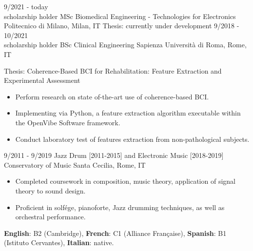 \documentclass[9pt]{developercv} %
\begin{document}
\vspace{-15 pt}
\begin{entrylist}
    \entry
		{9/2021 - today \\\footnotesize{scholarship holder}}
		{MSc Biomedical Engineering - Technologies for Electronics }
		{Politecnico di Milano, Milan, IT}
		{Thesis: currently under development}
    \entry
		{9/2018 - 10/2021 \\\footnotesize{scholarship holder}}
		{BSc Clinical Engineering}
		{Sapienza Università di Roma, Rome, IT}
		{Thesis: Coherence-Based BCI for Rehabilitation: Feature Extraction and Experimental Assessment
   \begin{itemize}[noitemsep,topsep=0pt,parsep=0pt,partopsep=0pt, leftmargin= 10pt]
            \item Perform research on state of-the-art use of coherence-based BCI. 
            \item Implementing via Python, a feature extraction algorithm executable within the OpenVibe Software framework.
            \item Conduct laboratory test of features extraction from non-pathological subjects.

        \end{itemize} 
             }
	\entry
		{9/2011 - 9/2019}
		{Jazz Drum [2011-2015] and Electronic Music [2018-2019]}
		{Conservatory of Music Santa Cecilia, Rome, IT}
		{ \begin{itemize}[noitemsep,topsep=0pt,parsep=0pt,partopsep=0pt, leftmargin= 10pt]
            \item Completed coursework in composition, music theory, application of signal theory to sound design. 
            \item Proficient in solfége, pianoforte, Jazz drumming techniques, as well as orchestral performance.
            \end{itemize}
        }
\end{entrylist}

\vspace{-15 pt}
    \vspace{-6pt}
    
    \hspace{26mm} \textbf{English}: B2 (Cambridge), \textbf{French}: C1 (Alliance Française), \textbf{Spanish}: B1 (Istituto Cervantes), \textbf{ Italian}: native.

\end{document}
